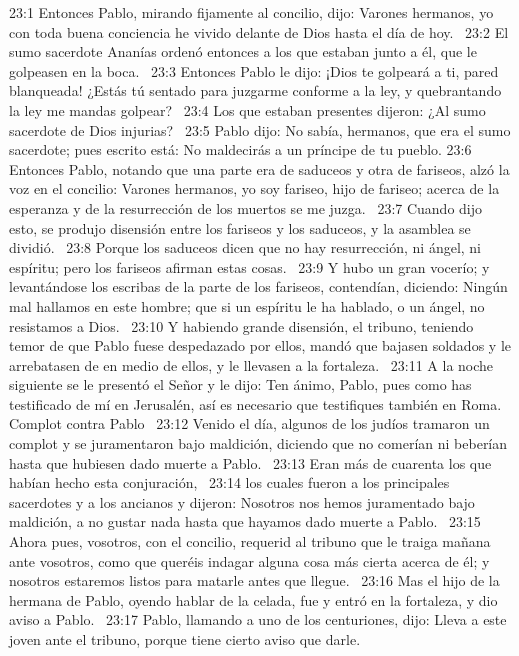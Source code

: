 23:1 Entonces Pablo, mirando fijamente al concilio, dijo: Varones hermanos, yo con toda buena conciencia he vivido delante de Dios hasta el día de hoy.  
23:2 El sumo sacerdote Ananías ordenó entonces a los que estaban junto a él, que le golpeasen en la boca.  
23:3 Entonces Pablo le dijo: ¡Dios te golpeará a ti, pared blanqueada! ¿Estás tú sentado para juzgarme conforme a la ley, y quebrantando la ley me mandas golpear?  
23:4 Los que estaban presentes dijeron: ¿Al sumo sacerdote de Dios injurias?  
23:5 Pablo dijo: No sabía, hermanos, que era el sumo sacerdote; pues escrito está: No maldecirás a un príncipe de tu pueblo. 
23:6 Entonces Pablo, notando que una parte era de saduceos y otra de fariseos, alzó la voz en el concilio: Varones hermanos, yo soy fariseo, hijo de fariseo; acerca de la esperanza y de la resurrección de los muertos se me juzga.  
23:7 Cuando dijo esto, se produjo disensión entre los fariseos y los saduceos, y la asamblea se dividió.  
23:8 Porque los saduceos dicen que no hay resurrección, ni ángel, ni espíritu; pero los fariseos afirman estas cosas.  
23:9 Y hubo un gran vocerío; y levantándose los escribas de la parte de los fariseos, contendían, diciendo: Ningún mal hallamos en este hombre; que si un espíritu le ha hablado, o un ángel, no resistamos a Dios.  
23:10 Y habiendo grande disensión, el tribuno, teniendo temor de que Pablo fuese despedazado por ellos, mandó que bajasen soldados y le arrebatasen de en medio de ellos, y le llevasen a la fortaleza.  
23:11 A la noche siguiente se le presentó el Señor y le dijo: Ten ánimo, Pablo, pues como has testificado de mí en Jerusalén, así es necesario que testifiques también en Roma.  
Complot contra Pablo  
23:12 Venido el día, algunos de los judíos tramaron un complot y se juramentaron bajo maldición, diciendo que no comerían ni beberían hasta que hubiesen dado muerte a Pablo.  
23:13 Eran más de cuarenta los que habían hecho esta conjuración,  
23:14 los cuales fueron a los principales sacerdotes y a los ancianos y dijeron: Nosotros nos hemos juramentado bajo maldición, a no gustar nada hasta que hayamos dado muerte a Pablo.  
23:15 Ahora pues, vosotros, con el concilio, requerid al tribuno que le traiga mañana ante vosotros, como que queréis indagar alguna cosa más cierta acerca de él; y nosotros estaremos listos para matarle antes que llegue.  
23:16 Mas el hijo de la hermana de Pablo, oyendo hablar de la celada, fue y entró en la fortaleza, y dio aviso a Pablo.  
23:17 Pablo, llamando a uno de los centuriones, dijo: Lleva a este joven ante el tribuno, porque tiene cierto aviso que darle.  
